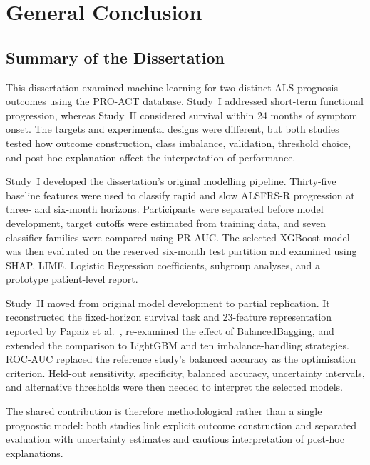 \chapter{General Conclusion}
\label{ch:conclusion}

\section{Summary of the Dissertation}
\label{sec:conclusion_summary}

This dissertation examined machine learning for two distinct \gls{ALS} prognosis outcomes using the \gls{PRO-ACT} database. Study~I addressed short-term functional progression, whereas Study~II considered survival within 24 months of symptom onset. The targets and experimental designs were different, but both studies tested how outcome construction, class imbalance, validation, threshold choice, and post-hoc explanation affect the interpretation of performance.

Study~I developed the dissertation's original modelling pipeline. Thirty-five baseline features were used to classify rapid and slow \gls{ALSFRS-R} progression at three- and six-month horizons. Participants were separated before model development, target cutoffs were estimated from training data, and seven classifier families were compared using \gls{PR-AUC}. The selected XGBoost model was then evaluated on the reserved six-month test partition and examined using \gls{SHAP}, \gls{LIME}, Logistic Regression coefficients, subgroup analyses, and a prototype patient-level report.

Study~II moved from original model development to partial replication. It reconstructed the fixed-horizon survival task and 23-feature representation reported by Papaiz et al.~\cite{Papaiz2024}, re-examined the effect of BalancedBagging, and extended the comparison to LightGBM and ten imbalance-handling strategies. \gls{ROC-AUC} replaced the reference study's balanced accuracy as the optimisation criterion. Held-out sensitivity, specificity, balanced accuracy, uncertainty intervals, and alternative thresholds were then needed to interpret the selected models.

The shared contribution is therefore methodological rather than a single prognostic model: both studies link explicit outcome construction and separated evaluation with uncertainty estimates and cautious interpretation of post-hoc explanations.

